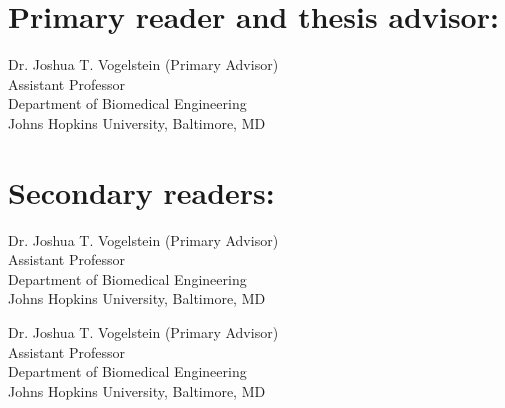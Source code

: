 

\Blindtext[3]




\begin{singlespace}

\section*{Primary reader and thesis advisor:}

Dr. Joshua T. Vogelstein (Primary Advisor)\\
Assistant Professor \\
Department of Biomedical Engineering\\
Johns Hopkins University, Baltimore, MD 



\section*{Secondary readers:}

Dr. Joshua T. Vogelstein (Primary Advisor)\\
Assistant Professor \\
Department of Biomedical Engineering\\
Johns Hopkins University, Baltimore, MD 

\vspace{0.1in}

Dr. Joshua T. Vogelstein (Primary Advisor)\\
Assistant Professor \\
Department of Biomedical Engineering\\
Johns Hopkins University, Baltimore, MD 


\end{singlespace}